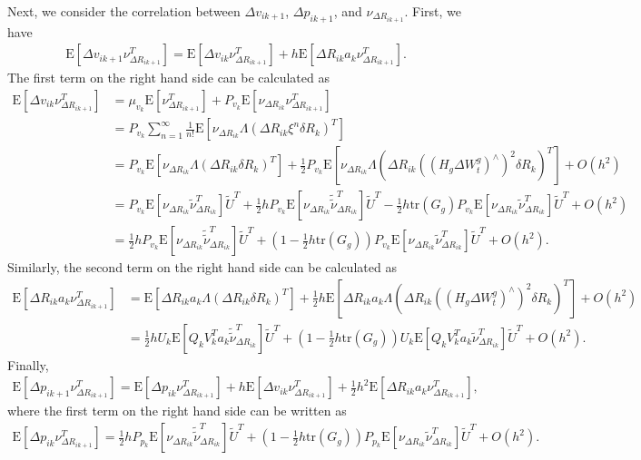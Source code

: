 \documentclass[10pt]{article}
\newcommand{\tr}[1]{\ensuremath{\mathrm{tr}\left( #1 \right)}}
\newcommand{\expect}[1]{\ensuremath{\mathrm{E}\left[ #1 \right]}}
\begin{document}
Next, we consider the correlation between $\Delta v_{ik+1}$, $\Delta p_{ik+1}$, and $\nu_{\Delta R_{ik+1}}$.
First, we have
\color{blue}
\begin{align}
	\expect{\Delta v_{ik+1} \nu_{\Delta R_{ik+1}}^T} = \expect{\Delta v_{ik} \nu_{\Delta R_{ik+1}}^T} + h\expect{\Delta R_{ik}a_k\nu_{\Delta R_{ik+1}}^T}.
\end{align}
\color{black}
The first term on the right hand side can be calculated as
\begin{align}
	\expect{\Delta v_{ik} \nu_{\Delta R_{ik+1}}^T} &= \mu_{v_k} \expect{\nu_{\Delta R_{ik+1}}^T} + P_{v_k} \expect{\nu_{\Delta R_{ik}} \nu_{\Delta R_{ik+1}}^T} \nonumber \\
	&= P_{v_k}\sum_{n=1}^\infty \tfrac{1}{n!} \expect{\nu_{\Delta R_{ik}} \Lambda\left( \Delta R_{ik}\xi^n\delta R_k \right)^T} \nonumber \\
	&= P_{v_k}\expect{\nu_{\Delta R_{ik}} \Lambda\left( \Delta R_{ik}\delta R_k \right)^T} + \tfrac{1}{2} P_{v_k} \expect{\nu_{\Delta R_{ik}} \Lambda\left( \Delta R_{ik} ((H_g\Delta W_t^g)^\wedge)^2 \delta R_k \right)^T} + O(h^2) \nonumber \\
	&= P_{v_k}\expect{\nu_{\Delta R_{ik}} \tilde{\nu}_{\Delta R_{ik}}^T}\tilde{U}^T + \tfrac{1}{2} hP_{v_k}\expect{\nu_{\Delta R_{ik}} \tilde{\tilde{\nu}}_{\Delta R_{ik}}^T} \tilde{U}^T - \tfrac{1}{2}h\tr{G_g} P_{v_k}\expect{\nu_{\Delta R_{ik}} \tilde{\nu}_{\Delta R_{ik}}^T} \tilde{U}^T + O(h^2) \nonumber \\
	&= \tfrac{1}{2} hP_{v_k}\expect{\nu_{\Delta R_{ik}} \tilde{\tilde{\nu}}_{\Delta R_{ik}}^T} \tilde{U}^T + \left( 1- \tfrac{1}{2}h\tr{G_g} \right) P_{v_k}\expect{\nu_{\Delta R_{ik}} \tilde{\nu}_{\Delta R_{ik}}^T} \tilde{U}^T + O(h^2).
\end{align}
Similarly, the second term on the right hand side can be calculated as
\begin{align}
	\expect{\Delta R_{ik}a_k\nu_{\Delta R_{ik+1}}^T} &= \expect{\Delta R_{ik}a_k\Lambda(\Delta R_{ik}\delta R_k)^T} + \tfrac{1}{2}h\expect{\Delta R_{ik}a_k\Lambda\left( \Delta R_{ik} ((H_g\Delta W_t^g)^\wedge)^2 \delta R_k \right)^T} + O(h^2) \nonumber \\
	&= \tfrac{1}{2}h U_k\expect{Q_kV_k^Ta_k\tilde{\tilde{\nu}}_{\Delta R_{ik}}^T} \tilde{U}^T + \left( 1- \tfrac{1}{2}h\tr{G_g} \right) U_k\expect{Q_kV_k^Ta_k\tilde{\nu}_{\Delta R_{ik}}^T} \tilde{U}^T + O(h^2).
\end{align}
Finally,
\color{blue}
\begin{align}
	\expect{\Delta p_{ik+1} \nu_{\Delta R_{ik+1}}^T} = \expect{\Delta p_{ik} \nu_{\Delta R_{ik+1}}^T} + h\expect{\Delta v_{ik}\nu_{\Delta R_{ik+1}}^T} + \tfrac{1}{2}h^2\expect{\Delta R_{ik}a_k\nu_{\Delta R_{ik+1}}^T},
\end{align}
\color{black}
where the first term on the right hand side can be written as
\begin{align}
	\expect{\Delta p_{ik} \nu_{\Delta R_{ik+1}}^T} = \tfrac{1}{2}hP_{p_k}\expect{\nu_{\Delta R_{ik}} \tilde{\tilde{\nu}}_{\Delta R_{ik}}^T} \tilde{U}^T + \left( 1- \tfrac{1}{2}h\tr{G_g} \right) P_{p_k}\expect{\nu_{\Delta R_{ik}} \tilde{\nu}_{\Delta R_{ik}}^T} \tilde{U}^T + O(h^2).
\end{align}
\end{document}
